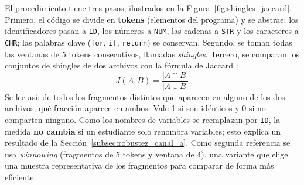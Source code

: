 El procedimiento tiene tres pasos, ilustrados en la Figura~\ref{fig:shingles_jaccard}. Primero, el código se divide en \textbf{tokens} (elementos del programa) y se abstrae: los identificadores pasan a \texttt{ID}, los números a \texttt{NUM}, las cadenas a \texttt{STR} y los caracteres a \texttt{CHR}; las palabras clave (\texttt{for}, \texttt{if}, \texttt{return}) se conservan. Segundo, se toman todas las ventanas de 5 tokens consecutivos, llamadas \textit{shingles}. Tercero, se comparan los conjuntos de shingles de dos archivos con la fórmula de Jaccard \cite{Broder1997Resemblance}:
\begin{equation}
    J(A, B) = \frac{|A \cap B|}{|A \cup B|}
\end{equation}
Se lee así: de todos los fragmentos distintos que aparecen en alguno de los dos archivos, qué fracción aparece en ambos. Vale 1 si son idénticos y 0 si no comparten ninguno. Como los nombres de variables se reemplazan por \texttt{ID}, la medida \textbf{no cambia} si un estudiante solo renombra variables; esto explica un resultado de la Sección~\ref{subsec:robustez_canal_a}. Como segunda referencia se usa \textit{winnowing} \cite{Schleimer2003Winnowing} (fragmentos de 5 tokens y ventana de 4), una variante que elige una muestra representativa de los fragmentos para comparar de forma más eficiente.

